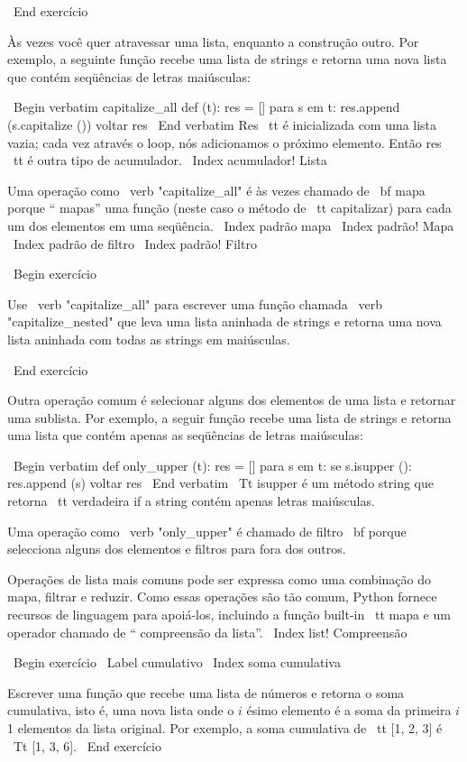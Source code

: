 \documentclass[10pt]{book}
\begin{document}
\begin {itemize}
{{{{{{\ End {} exercício

Às vezes você quer atravessar uma lista, enquanto a construção
outro. Por exemplo, a seguinte função recebe uma lista de strings
e retorna uma nova lista que contém seqüências de letras maiúsculas:

\ Begin {verbatim}
capitalize_all def (t):
    res = []
    para s em t:
        res.append (s.capitalize ())
    voltar res
\ End {verbatim}
%
{Res \ tt} é inicializada com uma lista vazia; cada vez através
o loop, nós adicionamos o próximo elemento. Então {res \ tt} é outra
tipo de acumulador.
\ Index {acumulador! Lista}

Uma operação como \ verb "capitalize_all" é às vezes chamado de {\ bf
mapa} porque `` mapas'' uma função (neste caso o método de {\ tt
capitalizar}) para cada um dos elementos em uma seqüência.
\ Index {padrão mapa}
\ Index {padrão! Mapa}
\ Index {padrão de filtro}
\ Index {padrão! Filtro}

\ Begin {} exercício

Use \ verb "capitalize_all" para escrever uma função chamada \ verb "capitalize_nested"
que leva uma lista aninhada de strings e retorna uma nova lista aninhada
com todas as strings em maiúsculas.

\ End {} exercício

Outra operação comum é selecionar alguns dos elementos de
uma lista e retornar uma sublista. Por exemplo, a seguir
função recebe uma lista de strings e retorna uma lista que contém
apenas as seqüências de letras maiúsculas:

\ Begin {verbatim}
def only_upper (t):
    res = []
    para s em t:
        se s.isupper ():
            res.append (s)
    voltar res
\ End {verbatim}
%
{\ Tt isupper} é um método string que retorna {\ tt verdadeira} if
a string contém apenas letras maiúsculas.

Uma operação como \ verb "only_upper" é chamado de filtro {\ bf} porque
selecciona alguns dos elementos e filtros para fora dos outros.

Operações de lista mais comuns pode ser expressa como uma combinação
do mapa, filtrar e reduzir. Como essas operações são
tão comum, Python fornece recursos de linguagem para apoiá-los,
incluindo a função built-in {\ tt mapa} e um operador
chamado de `` compreensão da lista''.
\ Index {list! Compreensão}

\ Begin {} exercício
\ Label {} cumulativo
\ Index {soma cumulativa}

Escrever uma função que recebe uma lista de números e retorna o
soma cumulativa, isto é, uma nova lista onde o $ i $ ésimo elemento
é a soma da primeira $ i $ 1 elementos da lista original.
Por exemplo, a soma cumulativa de {\ tt [1, 2, 3]} é
{\ Tt [1, 3, 6]}. 
\ End {} exercício


}}}}}}
\end{itemize}
\end{document}
